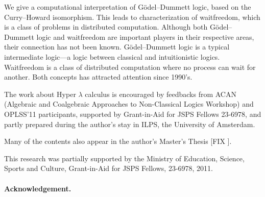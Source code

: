 \documentclass[doctor,interim]{iscs-thesis}
\date{July 4, 2012}
\newcommand{\fix}[1]{[FIX \fbox{#1}]}
\begin{document}
\begin{eabstract}
 We give a computational interpretation of G\"odel--Dummett logic, based
 on the Curry--Howard isomorphism.  This leads to characterization
 of waitfreedom, which is a class of problems in distributed
 computation.  Although both G\"odel--Dummett logic and waitfreedom are
 important players in their respective areas, their connection has not
 been known.  G\"odel--Dummett logic is a typical intermediate logic---a
 logic between classical and intuitionistic logics.
 Waitfreedom is a class of distributed computation where no process can
 wait for another.  Both concepts has attracted attention since 1990's.
\end{eabstract}

\begin{jabstract}
 $B%
 $B$k!#$9$k$H!"J,;67W;;$NLdBj%
 $B%
 $B$3$l$i$N4XO"$O!"$3$l$^$GCN$i$l$F$$$J$+$C$?!#(B
\end{jabstract}

\maketitle

\begin{acknowledge}
The work about Hyper $\lambda$ calculus is encouraged by feedbacks from
ACAN (Algebraic and
Coalgebraic
Approaches to
Non-Classical Logics Workshop) and OPLSS'11 participants,
supported by Grant-in-Aid for JSPS Fellows 23-6978,
and partly prepared during the author's stay in
ILPS, the University of Amsterdam.


Many of the contents also appear in the author's Master's Thesis \fix{cite}.
\end{acknowledge}

\frontmatter
\tableofcontents

\listoffigures
\listoftables

\mainmatter

%

%
%

This research was partially supported by the Ministry of Education,
Science, Sports and Culture, Grant-in-Aid for JSPS Fellows, 23-6978, 2011.






\paragraph{Acknowledgement.}

\appendix



\end{document}
